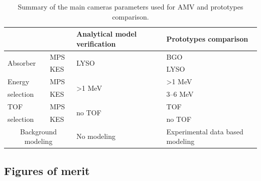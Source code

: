 \documentclass[a4paper,english]{article}
\begin{document}
\begin{table}[h]
\centering
\begin{tabular}{|l|l|l|l|}
	\hline
	\multicolumn{2}{|c|}{}& 	Analytical model verification & Prototypes comparison\\
	\hline
	\multirow{2}{*}{Absorber}	& MPS & \multirow{2}{*}{LYSO} 							& BGO \\
	\cline{2-2}\cline{4-4}
									& KES & 																& LYSO \\
	\hline
	Energy & MPS & \multirow{2}{*}{>1 MeV}			&		>1 MeV						\\
	\cline{2-2}\cline{4-4}
	selection				& KES & & 3--6 MeV \\
	\hline	
	TOF & MPS & \multirow{2}{*}{no TOF}			&		TOF						\\
	\cline{2-2}\cline{4-4}
	selection				& KES & & no TOF \\
	\hline		
	\multicolumn{2}{|c|}{Background modeling} & No modeling & Experimental data based modeling  \\
	\hline		
\end{tabular}
\caption{Summary of the main cameras parameters used for AMV and prototypes comparison.}
\label{table:CameraParameters}
\end{table}



\subsection{Figures of merit}\label{figmerit}



\end{document}
